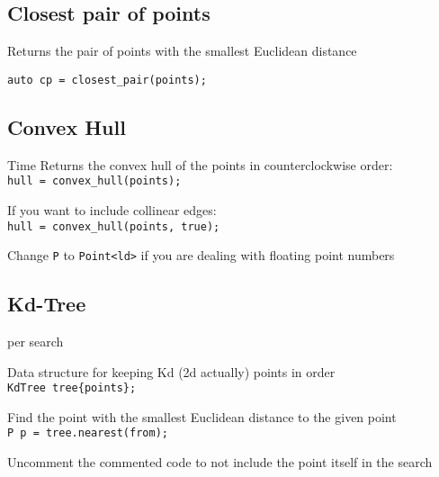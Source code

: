 \subsection{Closest pair of points}

Returns the pair of points with the smallest Euclidean distance

\verb|auto cp = closest_pair(points);|


\subsection{Convex Hull}
 Time
Returns the convex hull of the points in counterclockwise order: \\
\verb|hull = convex_hull(points);|

If you want to include collinear edges: \\
\verb|hull = convex_hull(points, true);|

Change \verb|P| to \verb|Point<ld>| if you are dealing with floating point numbers


\subsection{Kd-Tree}
 per search

Data structure for keeping Kd (2d actually) points in order \\
\verb|KdTree tree{points};|

Find the point with the smallest Euclidean distance to the given point \\
\verb|P p = tree.nearest(from);|

Uncomment the commented code to not include the point itself in the search
